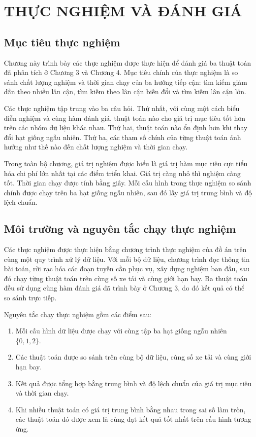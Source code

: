 \chapter{THỰC NGHIỆM VÀ ĐÁNH GIÁ}
\label{chap:thuc-nghiem-va-danh-gia}

\section{Mục tiêu thực nghiệm}

Chương này trình bày các thực nghiệm được thực hiện để đánh giá ba thuật toán đã phân tích ở Chương 3 và Chương 4. Mục tiêu chính của thực nghiệm là so sánh chất lượng nghiệm và thời gian chạy của ba hướng tiếp cận: tìm kiếm giảm dần theo nhiều lân cận, tìm kiếm theo lân cận biến đổi và tìm kiếm lân cận lớn.

Các thực nghiệm tập trung vào ba câu hỏi. Thứ nhất, với cùng một cách biểu diễn nghiệm và cùng hàm đánh giá, thuật toán nào cho giá trị mục tiêu tốt hơn trên các nhóm dữ liệu khác nhau. Thứ hai, thuật toán nào ổn định hơn khi thay đổi hạt giống ngẫu nhiên. Thứ ba, các tham số chính của từng thuật toán ảnh hưởng như thế nào đến chất lượng nghiệm và thời gian chạy.

Trong toàn bộ chương, giá trị nghiệm được hiểu là giá trị hàm mục tiêu cực tiểu hóa chi phí lớn nhất tại các điểm triển khai. Giá trị càng nhỏ thì nghiệm càng tốt. Thời gian chạy được tính bằng giây. Mỗi cấu hình trong thực nghiệm so sánh chính được chạy trên ba hạt giống ngẫu nhiên, sau đó lấy giá trị trung bình và độ lệch chuẩn.

\section{Môi trường và nguyên tắc chạy thực nghiệm}

Các thực nghiệm được thực hiện bằng chương trình thực nghiệm của đồ án trên cùng một quy trình xử lý dữ liệu. Với mỗi bộ dữ liệu, chương trình đọc thông tin bài toán, rời rạc hóa các đoạn tuyến cần phục vụ, xây dựng nghiệm ban đầu, sau đó chạy từng thuật toán trên cùng số xe tải và cùng giới hạn bay. Ba thuật toán đều sử dụng cùng hàm đánh giá đã trình bày ở Chương 3, do đó kết quả có thể so sánh trực tiếp.

Nguyên tắc chạy thực nghiệm gồm các điểm sau:
\begin{enumerate}[leftmargin=1.2cm]
    \item Mỗi cấu hình dữ liệu được chạy với cùng tập ba hạt giống ngẫu nhiên $\{0,1,2\}$.
    \item Các thuật toán được so sánh trên cùng bộ dữ liệu, cùng số xe tải và cùng giới hạn bay.
    \item Kết quả được tổng hợp bằng trung bình và độ lệch chuẩn của giá trị mục tiêu và thời gian chạy.
    \item Khi nhiều thuật toán có giá trị trung bình bằng nhau trong sai số làm tròn, các thuật toán đó được xem là cùng đạt kết quả tốt nhất trên cấu hình tương ứng.
\end{enumerate}

